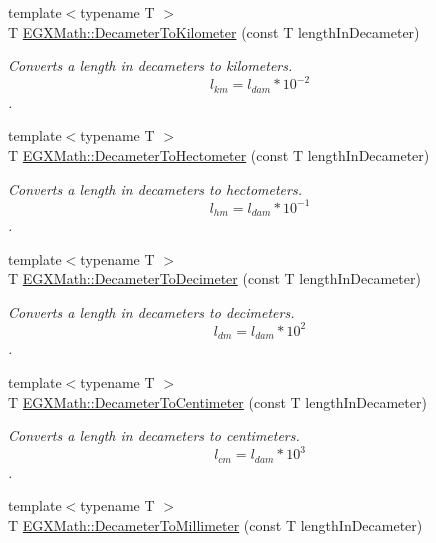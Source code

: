 \begin{DoxyCompactItemize}
{\footnotesize template$<$typename T $>$ }\\T \mbox{\hyperlink{group___e_g_x_math-_conversions-_length_conversions-_s_i-_decameter-_s_i_gaecb6cb385676cad8430d23e529e4a59e}{E\+G\+X\+Math\+::\+Decameter\+To\+Kilometer}} (const T length\+In\+Decameter)
\begin{DoxyCompactList}\small\item\em Converts a length in decameters to kilometers. \[ l_{km}=l_{dam} * 10^{-2} \]. \end{DoxyCompactList}\item 
{\footnotesize template$<$typename T $>$ }\\T \mbox{\hyperlink{group___e_g_x_math-_conversions-_length_conversions-_s_i-_decameter-_s_i_ga24daff76ac2de77bf8f55d134aa450d8}{E\+G\+X\+Math\+::\+Decameter\+To\+Hectometer}} (const T length\+In\+Decameter)
\begin{DoxyCompactList}\small\item\em Converts a length in decameters to hectometers. \[ l_{hm}=l_{dam} * 10^{-1} \]. \end{DoxyCompactList}\item 
{\footnotesize template$<$typename T $>$ }\\T \mbox{\hyperlink{group___e_g_x_math-_conversions-_length_conversions-_s_i-_decameter-_s_i_gac3c82c1b67121be9717c2619bc26242b}{E\+G\+X\+Math\+::\+Decameter\+To\+Decimeter}} (const T length\+In\+Decameter)
\begin{DoxyCompactList}\small\item\em Converts a length in decameters to decimeters. \[ l_{dm}=l_{dam} * 10^{2} \]. \end{DoxyCompactList}\item 
{\footnotesize template$<$typename T $>$ }\\T \mbox{\hyperlink{group___e_g_x_math-_conversions-_length_conversions-_s_i-_decameter-_s_i_gab715f0e130e7886966146153786abc5d}{E\+G\+X\+Math\+::\+Decameter\+To\+Centimeter}} (const T length\+In\+Decameter)
\begin{DoxyCompactList}\small\item\em Converts a length in decameters to centimeters. \[ l_{cm}=l_{dam} * 10^{3} \]. \end{DoxyCompactList}\item 
{\footnotesize template$<$typename T $>$ }\\T \mbox{\hyperlink{group___e_g_x_math-_conversions-_length_conversions-_s_i-_decameter-_s_i_gaa1ebc69084f0d429e62a6af0ef509bb7}{E\+G\+X\+Math\+::\+Decameter\+To\+Millimeter}} (const T length\+In\+Decameter)

\end{DoxyCompactItemize}

